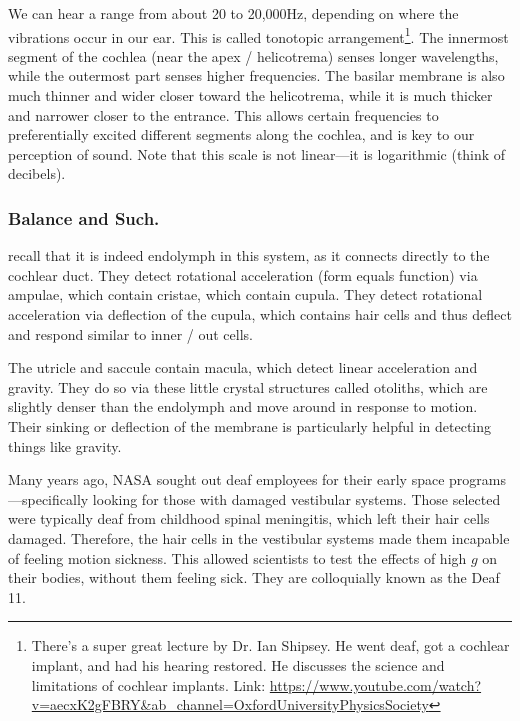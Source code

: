 \documentclass[12pt]{report}
\begin{document}
We can hear a range from about 20 to 20,000Hz, depending on where the vibrations occur in our ear. This is called tonotopic arrangement\footnote{There's a super great lecture by Dr. Ian Shipsey. He went deaf, got a cochlear implant, and had his hearing restored. He discusses the science and limitations of cochlear implants. Link: \url{https://www.youtube.com/watch?v=aecxK2gFBRY&ab_channel=OxfordUniversityPhysicsSociety}}. The innermost segment of the cochlea (near the apex / helicotrema) senses longer wavelengths, while the outermost part senses higher frequencies. The basilar membrane is also much thinner and wider closer toward the helicotrema, while it is much thicker and narrower closer to the entrance. This allows certain frequencies to preferentially excited different segments along the cochlea, and is key to our perception of sound. Note that this scale is not linear---it is logarithmic (think of decibels).

\subsubsection{Balance and Such.}

recall that it is indeed endolymph in this system, as it connects directly to the cochlear duct. They detect rotational acceleration (form equals function) via ampulae, which contain cristae, which contain cupula. They detect rotational acceleration via deflection of the cupula, which contains hair cells and thus deflect and respond similar to inner / out cells.\newline

The utricle and saccule contain macula, which detect linear acceleration and gravity. They do so via these little crystal structures called otoliths, which are slightly denser than the endolymph and move around in response to motion. Their sinking or deflection of the membrane is particularly helpful in detecting things like gravity.\newline

Many years ago, NASA sought out deaf employees for their early space programs---specifically looking for those with damaged vestibular systems. Those selected were typically deaf from childhood spinal meningitis, which left their hair cells damaged. Therefore, the hair cells in the vestibular systems made them incapable of feeling motion sickness. This allowed scientists to test the effects of high $g$ on their bodies, without them feeling sick. They are colloquially known as the Deaf 11. 
\end{document}
